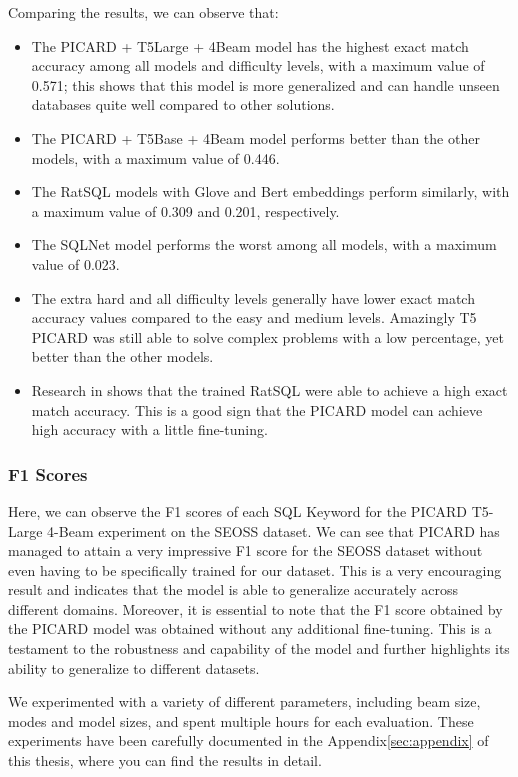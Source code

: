 Comparing the results, we can observe that:
\begin{itemize}
    \item The PICARD + T5Large + 4Beam model has the highest exact match accuracy among all models and difficulty levels, with a maximum value of 0.571; this shows that this model is more generalized and can handle unseen databases quite well compared to other solutions.
    \item The PICARD + T5Base + 4Beam model performs better than the other models, with a maximum value of 0.446.
    \item The RatSQL models with Glove and Bert embeddings perform similarly, with a maximum value of 0.309 and 0.201, respectively.
    \item The SQLNet model performs the worst among all models, with a maximum value of 0.023.
    \item The extra hard and all difficulty levels generally have lower exact match accuracy values compared to the easy and medium levels. Amazingly T5 PICARD was still able to solve complex problems with a low percentage, yet better than the other models.
    \item Research in\cite{TOMOVA2022108211} shows that the trained RatSQL were able to achieve a high exact match accuracy. This is a good sign that the PICARD model can achieve high accuracy with a little fine-tuning.
\end{itemize}

\subsubsection*{F1 Scores}

Here, we can observe the F1 scores of each SQL Keyword for the PICARD T5-Large 4-Beam experiment on the SEOSS dataset. We can see that PICARD has managed to attain a very impressive F1 score for the SEOSS dataset without even having to be specifically trained for our dataset. This is a very encouraging result and indicates that the model is able to generalize accurately across different domains. Moreover, it is essential to note that the F1 score obtained by the PICARD model was obtained without any additional fine-tuning. This is a testament to the robustness and capability of the model and further highlights its ability to generalize to different datasets.

We experimented with a variety of different parameters, including beam size, modes and model sizes, and spent multiple hours for each evaluation. These experiments have been carefully documented in the Appendix\ref{sec:appendix} of this thesis, where you can find the results in detail.

